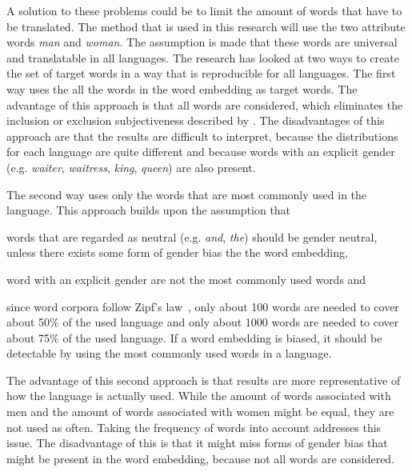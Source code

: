 A solution to these problems could be to limit the amount of words that have to be
translated. The method that is used in this research will use the two attribute words 
\textit{man} and \textit{woman}. The assumption is made that these words are universal and translatable in all languages. The research has looked at two ways to create the set of
target words in a way that is reproducible for all languages. The first way uses the
all the words in the word embedding as target words. The advantage of this approach is 
that all words are considered, which eliminates the inclusion or exclusion subjectiveness
described by \textcite{nissim_fair_is_better_2020}. The disadvantages of this approach
are that the results are difficult to interpret, because the distributions for each
language are quite different and because words with an explicit 
gender (e.g. \textit{waiter}, \textit{waitress}, \textit{king}, \textit{queen}) are also 
present.

The second way uses only the words that are most commonly used in the language. This
approach builds upon the assumption that 
\begin{seriate}
\item words that are regarded as neutral (e.g. \textit{and}, \textit{the}) should be
    gender neutral, unless there exists some form of gender bias the the word embedding,
\item word with an explicit gender are not the most commonly used words and
\item since word corpora follow Zipf's law~\parencite{li1992random}, only about 100 words are needed to cover about 50\% of the used language and only about 1000 words are needed to cover about 75\% of the used language. If a word embedding is biased, it should be detectable by using the most commonly used words in a language.
\end{seriate}
The advantage of this second approach is that results are more representative of how
the language is actually used. While the amount of words associated with men and the
amount of words associated with women might be equal, they are not used as often.
Taking the frequency of words into account addresses this issue. 
The disadvantage of this is that
it might miss forms of gender bias that might be present in the word embedding, because
not all words are considered.

